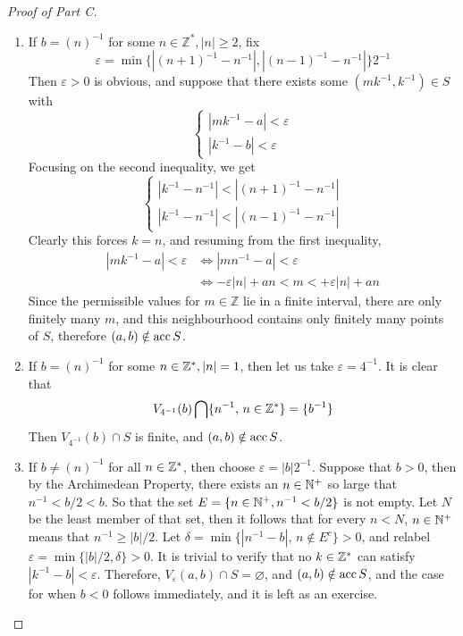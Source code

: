 \documentclass[../../main.tex]{subfiles}
\begin{document}
\begin{proof}[Proof of Part C]
    \begin{enumerate}
        \item If $b=(n)^{-1}$ for some $n\in\mathbb{Z}^*, |n|\geq 2$, fix 
        \[
            \varepsilon=\min\biggl\{|(n+1)^{-1}-n^{-1}|,|(n-1)^{-1}-n^{-1}|\biggr\}2^{-1}
        \]
        Then $\varepsilon>0$ is obvious, and suppose that there exists some $(mk^{-1},k^{-1})\in S$ with
        \[\begin{cases}
            |mk^{-1}-a|<\varepsilon\\
            |k^{-1}-b|<\varepsilon
        \end{cases}\]
        Focusing on the second inequality, we get
        \[\begin{cases}
            |k^{-1}-n^{-1}|<|(n+1)^{-1}-n^{-1}|\\
            |k^{-1}-n^{-1}|<|(n-1)^{-1}-n^{-1}|
        \end{cases}\]
        Clearly this forces $k=n$, and resuming from the first inequality, 
        \begin{align*}
            |mk^{-1}-a|<\varepsilon&\iff |mn^{-1}-a|<\varepsilon\\
            &\iff -\varepsilon|n|+an<m<+\varepsilon|n|+an
        \end{align*}
        Since the permissible values for $m\in\mathbb{Z}$ lie in a finite interval, there are only finitely many $m$, and this neighbourhood contains only finitely many points of $S$, therefore $(a,b)\notin \operatorname{acc}{S}$.
        \item If $b=(n)^{-1}$ for some $n\in\mathbb{Z}^*, |n|=1$, then let us take $\varepsilon=4^{-1}$. It is clear that 
        \[
            V_{4^{-1}}(b)\bigcap\{n^{-1},\,n\in\mathbb{Z}^*\}=\{b^{-1}\}
        \]
        Then $V_{4^{-1}}(b)\cap S$ is finite, and $(a,b)\notin\operatorname{acc}{S}$.
        \item If $b\neq(n)^{-1}$ for all $n\in\mathbb{Z}^*$, then choose $\varepsilon=|b|2^{-1}$. Suppose that $b>0$, then by the Archimedean Property, there exists an $n\in\mathbb{N}^+$ so large that $n^{-1}<b/2<b$. So that the set $E=\{n\in\mathbb{N}^+, n^{-1}<b/2\}$ is not empty. Let $N$ be the least member of that set, then it follows that for every $n<N$, $n\in\mathbb{N}^+$ means that $n^{-1}\geq |b|/2$. Let $\delta=\min\{|n^{-1}-b|,\,n\notin E^c\}>0$, and relabel $\varepsilon=\min\{|b|/2,\delta\}>0$. It is trivial to verify that no $k\in\mathbb{Z}^*$ can satisfy $|k^{-1}-b|<\varepsilon$. Therefore, $V_\varepsilon(a,b)\cap S=\varnothing$, and $(a,b)\notin\operatorname{acc}{S}$, and the case for when $b<0$ follows immediately, and it is left as an exercise.
    \end{enumerate}
\end{proof}\newpage
\end{document}

